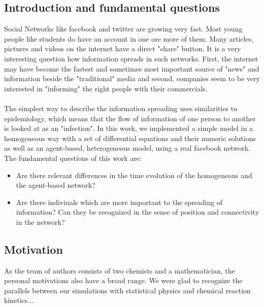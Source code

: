 \subsection{Introduction and fundamental questions}

Social Networks like facebook and twitter are growing very fast. Most young people like students do have an account in one ore more of them. Many articles, pictures and videos on the internet have a direct "share" button. It is a very interesting question how information spreads in such networks. First, the internet may have become the fastest and sometimes most important source of "news" and information beside the "traditional" media and second, companies seem to be very interested in "informing" the right people with their commercials. 
\\
\\
The simplest way to describe the information spreading uses similarities to epidemiology, which means that the flow of information of one person to another is looked at as an "infection". In this work, we implemented a simple model in a homogeneous way with a set of differential equations and their numeric solutions as well as an agent-based, heterogeneous model, using a real facebook network.
\\
The fundamental questions of this work are:

\begin{itemize}
\item Are there relevant differences in the time evolution of the homogeneous and the agent-based network?

\item Are there indiviuals which are more important to the spreading of information? Can they be recognized in the sense of position and connectivity in the network?
\end{itemize}

\subsection{Motivation}

As the team of authors consists of two chemists and a mathematician, the personal motivations also have a broad range. We were glad to recognize the parallels between our simulations with statistical physics and chemical reaction kinetics... 














